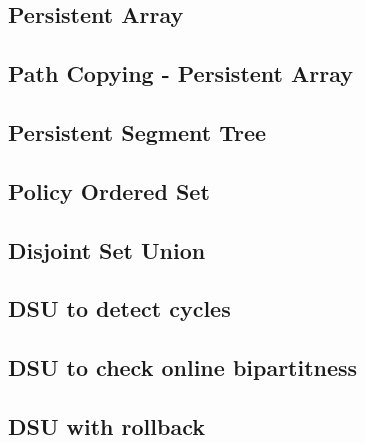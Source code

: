 \documentclass[10pt]{article}
\begin{document}
\begin{multicols*}{2}
\subsection{Persistent Array}


\subsection{Path Copying - Persistent Array}


\subsection{Persistent Segment Tree}


\subsection{Policy Ordered Set}


\subsection{Disjoint Set Union}


\subsection{DSU to detect cycles}


\subsection{DSU to check online bipartitness}


\subsection{DSU with rollback}



\end{multicols*}
\end{document}
